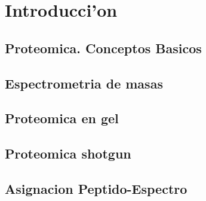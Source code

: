 %


\chapter{Introducci'on}





\section{Proteomica. Conceptos Basicos}


\label{cap1:sec:introduccion}


\section{Espectrometria de masas}



\section{Proteomica en gel}



\section{Proteomica shotgun}



\section{Asignacion Peptido-Espectro}



